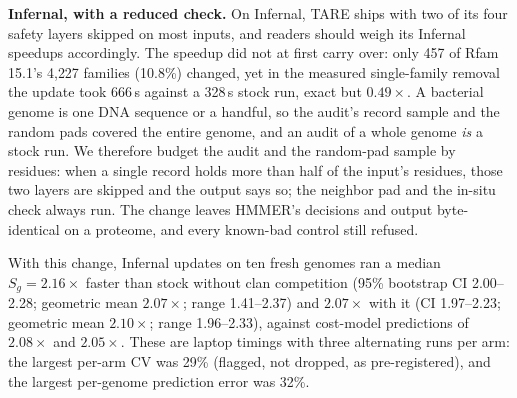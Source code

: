 \documentclass[letterpaper,twocolumn,10pt]{article}
\theoremstyle{definition}
\newcommand{\sys}{TARE\xspace}
\newcommand{\sys}{PARE\xspace}
\begin{document}
\textbf{Infernal, with a reduced check.} On Infernal, \sys ships with two of its four safety layers skipped on most
inputs, and readers should weigh its Infernal speedups accordingly. The speedup did not at first carry over: only 457 of
Rfam 15.1's 4{,}227 families (10.8\%) changed, yet in the measured single\nobreakdash-family removal the update took 666\,s against a
328\,s stock run, exact but $0.49\times$. A bacterial genome is one DNA sequence or a handful, so the audit's record
sample and the random pads covered the entire genome, and an audit of a whole genome \textit{is} a stock run. We
therefore budget the audit and the random\nobreakdash-pad sample by residues: when a single record holds more than half of the
input's residues, those two layers are skipped and the output says so; the neighbor pad and the in\nobreakdash-situ check always
run. The change leaves HMMER's decisions and output byte\nobreakdash-identical on a proteome, and every known\nobreakdash-bad control
still refused.

With this change, Infernal updates on ten fresh genomes ran a median $S_g = 2.16\times$ faster than stock without clan
competition (95\% bootstrap CI 2.00--2.28; geometric mean $2.07\times$; range 1.41--2.37) and $2.07\times$ with it (CI
1.97--2.23; geometric mean $2.10\times$; range 1.96--2.33), against cost\nobreakdash-model predictions of $2.08\times$ and $2.05\times$.
These are laptop timings with three alternating runs per arm: the largest per\nobreakdash-arm CV was 29\% (flagged, not dropped, as
pre\nobreakdash-registered), and the largest per\nobreakdash-genome prediction error was 32\%.
\end{document}
